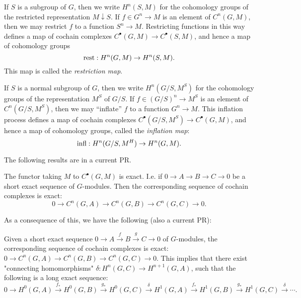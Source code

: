 \begin{definition} \label{def:restriction map}
	If $S$ is a subgroup of $G$, then we write $H^n(S,M)$ for the
	cohomology groups of the restricted representation $M \downarrow S$.
	If $f \in G^n \to M$ is an element of $C^n(G,M)$, then we may restrict $f$ to
	a function $S^n \to M$. Restricting functions in this way defines a map of
	cochain complexes $C^\bullet(G,M) \to C^\bullet(S,M)$, and hence a map of
	cohomology groups
	\[
		\mathrm{rest} : H^n(G,M) \to H^n(S,M).
	\]
	This map is called the \emph{restriction map}.
\end{definition}

\begin{definition} \label{def:inflation map}
	If $S$ is a normal subgroup of $G$, then we write $H^n(G/S,M^S)$ for the
	cohomology groups of the representation $M^S$ of $G/S$.
	If $f \in (G/S)^n \to M^S$ is an element of $C^n(G/S,M^S)$, then we may ``inflate'' $f$ to
	a function $G^n \to M$. This inflation process defines a map of
	cochain complexes $C^\bullet(G/S,M^S) \to C^\bullet(G,M)$, and hence a map of
	cohomology groups, called the \emph{inflation map}:
	\[
		\mathrm{infl} : H^n(G/S,M^H) \to H^n(G,M).
	\]
\end{definition}

The following results are in a current PR.

\begin{lemma} \label{lem:cochainsFunctor exact}
  The functor taking $M$ to $C^\bullet (G,M)$ is exact.
  I.e. if $0 \to A \to B \to C \to 0$ be a short exact sequence of $G$-modules.
  Then the corresponding sequence of cochain complexes is exact:
  \[
    0 \to C^n(G,A) \to C^n(G,B) \to C^n(G,C) \to 0.
  \]
\end{lemma}

As a consequence of this, we have the following (also a current PR):

\begin{definition} \label{def:cohomology long exact sequence}
  Given a short exact sequence $0 \to A \stackrel{f}\to B \stackrel{g}\to C \to 0$ of $G$-modules,
  the corresponding sequence of cochain complexes is exact:
  $0 \to C^n(G,A) \to C^n(G,B) \to C^n(G,C) \to 0$.
  This implies that there exist "connecting homomorphisms" $\delta : H^n(G,C) \to H^{n+1}(G,A)$,
  such that the following is a long exact sequence:
  \[
    0 \to H^0(G,A) \stackrel{f_*}\to H^0(G,B) \stackrel{g_*}\to H^0(G,C) \stackrel{\delta}\to
    H^1(G,A) \stackrel{f_*}\to H^1(G,B) \stackrel{g_*} \to H^1(G,C) \stackrel{\delta}\to \cdots.
  \]
\end{definition}


